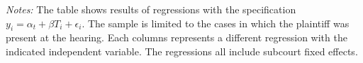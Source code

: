 

\begin{table}[!ht]
    \caption{Balance regression on characteristics conditional on employee present}
    \label{ep_balance}
    \begin{center}
    \scriptsize{}
    \end{center}
     \scriptsize
    \textit{Notes:} The table shows results of regressions with the specification $y_i = \alpha_t + \beta T_i + \epsilon_{i}$. The sample is limited to the cases in which the plaintiff was present at the hearing.  Each columns represents a different regression with the indicated independent variable. The regressions all include subcourt fixed effects. 
         
\end{table}




